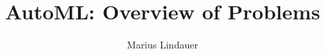 




\title[AutoML: Problem]{AutoML: Overview of Problems}
\author{Marius Lindauer}
\date{}





	
	\maketitle
	


